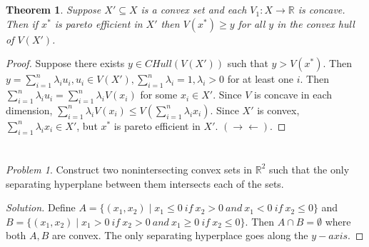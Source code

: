 \documentclass[12pt]{article}
\newtheorem{thm}{Theorem}[section]
\theoremstyle{definition}
\theoremstyle{remark}
\newtheorem{prob}{Problem}[section]
\def\RR{\mathbb{R}}
\def\la{\lambda}
\def\contra{\rightarrow \leftarrow}
\begin{document}
\section{}
\begin{thm}
  Suppose $X' \subseteq X$ is a convex set and each $V_1:X \rightarrow \RR$ is concave. Then if $x^*$ is pareto efficient in $X'$ then $V(x^*) \geq y$ for all $y$ in the convex hull of $V(X')$.
\end{thm}
\begin{proof}
  Suppose there exists $y \in CHull(V(X'))$ such that $y > V(x^*)$. Then $y = \sum^n_{i = 1}\la_iu_i, u_i \in V(X'), \sum^n_{i = 1} \la_i = 1, \la_i > 0$ for at least one $i$.
  Then $\sum^n_{i = 1}\la_iu_i = \sum^n_{i = 1}\la_iV(x_i)$ for some $x_i \in X'$. Since $V$ is concave in each dimension, $\sum^n_{i = 1}\la_iV(x_i) \leq V(\sum^n_{i = 1}\la_ix_i)$. Since $X'$ is convex, $\sum^n_{i = 1}\la_ix_i \in X'$, but $x^*$ is pareto efficient in $X'$. $(\contra)$.
\end{proof}
%
%
\section{}
\begin{prob}
  Construct two nonintersecting convex sets in $\RR^2$ such that the only separating hyperplane between them intersects each of the sets.
\end{prob}
\begin{proof}[Solution]
  Define $A = \{(x_1, x_2) \mid x_1 \leq 0 \ if \ x_2 > 0 \ and \ x_1 < 0 \ if \ x_2 \leq 0 \}$ and $B = \{(x_1, x_2) \mid x_1 > 0 \ if \ x_2 > 0 \ and \ x_1 \geq 0 \ if \ x_2 \leq 0 \}$.
  Then $A \cap B = \emptyset$ where both $A, B$ are convex. The only separating hyperplace goes along the $y-axis$.
\end{proof}
%
%
\section{}
%
%
\section{}
%
%
\section{}
%
%
\end{document}
